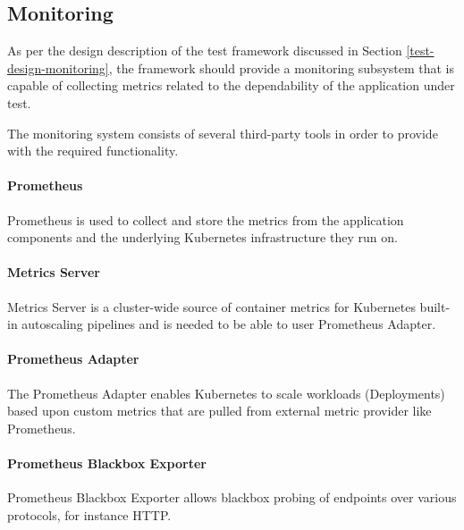 \subsection{Monitoring} \label{test-impl-monitoring}

%	
%	

As per the design description of the test framework discussed in Section \ref{test-design-monitoring}, the framework should provide a monitoring subsystem that is capable of collecting metrics related to the dependability of the application under test.

The monitoring system consists of several third-party tools in order to provide with the required functionality.

\paragraph{Prometheus} Prometheus is used to collect and store the metrics from the application components and the underlying Kubernetes infrastructure they run on.

\paragraph{Metrics Server} Metrics Server is a cluster-wide source of container metrics for Kubernetes built-in autoscaling pipelines and is needed to be able to user Prometheus Adapter.

\paragraph{Prometheus Adapter} The Prometheus Adapter enables Kubernetes to scale workloads (\eg Deployments) based upon custom metrics that are pulled from external metric provider like Prometheus.

\paragraph{Prometheus Blackbox Exporter} Prometheus Blackbox Exporter allows blackbox probing of endpoints over various protocols, for instance HTTP.

